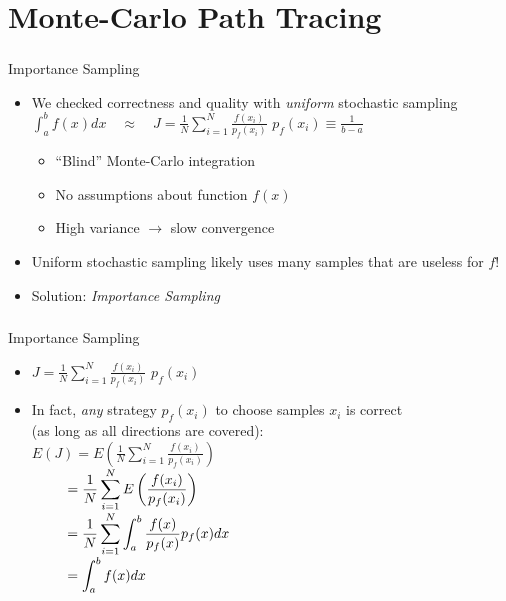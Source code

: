 \documentclass[utf8,stillsansserifmath,fleqn,t]{beamer}
\newcommand{\ds}{\displaystyle}
\begin{document}
\section{Monte-Carlo Path Tracing}

\begin{frame}
\frametitle{\insertsection}
Importance Sampling
\begin{itemize}
\item We checked correctness and quality with \emph{uniform} stochastic
    sampling\\
    $\ds \int_a^bf(x)dx \quad \approx \quad J = \frac{1}{N}\sum_{i=1}^{N} \frac{f(x_i)}{p_f(x_i)}$ \quad{}\quad $p_f(x_i) \equiv \frac{1}{b-a}$
    \begin{itemize}
    \item ``Blind'' Monte-Carlo integration
    \item No assumptions about function $f(x)$
    \item High variance $\rightarrow$ slow convergence
    \end{itemize}
\item Uniform stochastic sampling likely uses many samples
that are useless for $f$!\\
\item Solution: \emph{Importance Sampling}
\end{itemize}
\end{frame}

\begin{frame}
\frametitle{\insertsection}
Importance Sampling
\begin{itemize}
\item $\ds J = \frac{1}{N}\sum_{i=1}^{N} \frac{f(x_i)}{p_f(x_i)}$ \quad{}\quad $p_f(x_i)$
\item In fact, \emph{any} strategy $p_f(x_i)$ to choose samples $x_i$ is
correct\\(as long as all directions are covered):\\
      $\ds E(J)            = E\left(\frac{1}{N}\sum_{i=1}^{N}\frac{f(x_i)}{p_f(x_i)}\right)$\\
      $\ds \hphantom{E(J)} = \frac{1}{N} \sum_{i=1}^{N} E\left(\frac{f(x_i)}{p_f(x_i)}\right)$\\
      $\ds \hphantom{E(J)} = \frac{1}{N} \sum_{i=1}^{N} \int_a^b\frac{f(x)}{p_f(x)}p_f(x)dx$\\
      $\ds \hphantom{E(J)} = \int_a^b f(x)dx$
\end{itemize}
\end{frame}
\end{document}
